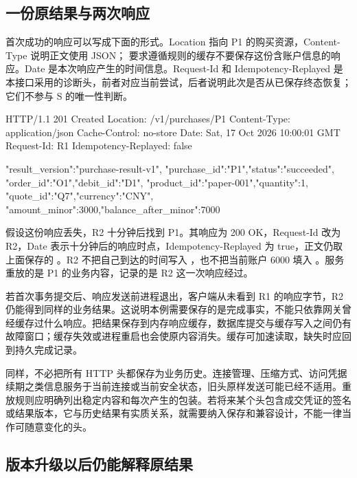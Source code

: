 \subsection*{一份原结果与两次响应}

首次成功的响应可以写成下面的形式。Location 指向 P1 的购买资源，Content-Type 说明正文使用 JSON； 要求遵循规则的缓存不要保存这份含账户信息的响应\cite{httpcache}。Date 是本次响应产生的时间信息。Request-Id 和 Idempotency-Replayed 是本接口采用的诊断头，前者对应当前尝试，后者说明此次是否从已保存终态恢复；它们不参与 S 的唯一性判断。

\begin{BookCode}
HTTP/1.1 201 Created
Location: /v1/purchases/P1
Content-Type: application/json
Cache-Control: no-store
Date: Sat, 17 Oct 2026 10:00:01 GMT
Request-Id: R1
Idempotency-Replayed: false

{"result_version":"purchase-result-v1",
 "purchase_id":"P1","status":"succeeded",
 "order_id":"O1","debit_id":"D1",
 "product_id":"paper-001","quantity":1,
 "quote_id":"Q7","currency":"CNY",
 "amount_minor":3000,"balance_after_minor":7000}
\end{BookCode}

假设这份响应丢失，R2 十分钟后找到 P1。其响应为 200 OK，Request-Id 改为 R2，Date 表示十分钟后的响应时点，Idempotency-Replayed 为 true，正文仍取上面保存的 。R2 不把自己到达的时间写入 ，也不把当前账户 6000 填入 。服务重放的是 P1 的业务内容，记录的是 R2 这一次响应经过。



若首次事务提交后、响应发送前进程退出，客户端从未看到 R1 的响应字节，R2 仍能得到同样的业务结果。这说明本例需要保存的是完成事实，不能只依靠网关曾经缓存过什么响应。把结果保存到内存响应缓存，数据库提交与缓存写入之间仍有故障窗口；缓存失效或进程重启也会使原内容消失。缓存可加速读取，缺失时应回到持久完成记录。

同样，不必把所有 HTTP 头都保存为业务历史。连接管理、压缩方式、访问凭据续期之类信息服务于当前连接或当前安全状态，旧头原样发送可能已经不适用。重放规则应明确列出稳定内容和每次产生的包装。若将来某个头包含成交凭证的签名或结果版本，它与历史结果有实质关系，就需要纳入保存和兼容设计，不能一律当作可随意变化的头。

\subsection*{版本升级以后仍能解释原结果}

